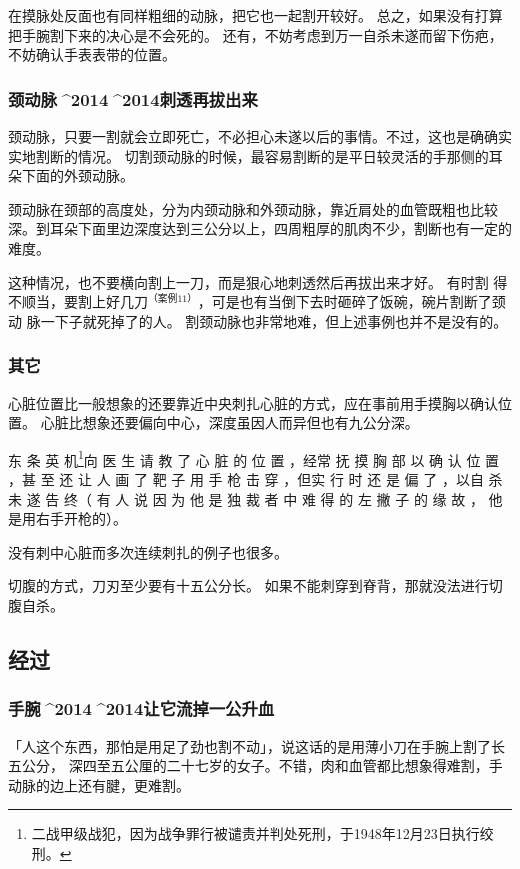\documentclass[UTF8]{ctexart}
\begin{document}
在摸脉处反面也有同样粗细的动脉，把它也一起割开较好。
总之，如果没有打算把手腕割下来的决心是不会死的。 
还有，不妨考虑到万一自杀未遂而留下伤疤，不妨确认手表表带的位置。

\subsubsection{颈动脉^^^^2014^^^^2014刺透再拔出来}

颈动脉，只要一割就会立即死亡，不必担心未遂以后的事情。不过，这也是确确实实地割断的情况。
切割颈动脉的时候，最容易割断的是平日较灵活的手那侧的耳朵下面的外颈动脉。

颈动脉在颈部的高度处，分为内颈动脉和外颈动脉，靠近肩处的血管既粗也比较深。到耳朵下面里边深度达到三公分以上，四周粗厚的肌肉不少，割断也有一定的难度。

这种情况，也不要横向割上一刀，而是狠心地刺透然后再拔出来才好。
有时割 得不顺当，要割上好几刀$^{（案例11）}$，可是也有当倒下去时砸碎了饭碗，碗片割断了颈动 脉一下子就死掉了的人。
割颈动脉也非常地难，但上述事例也并不是没有的。

\subsubsection{其它}

心脏位置比一般想象的还要靠近中央刺扎心脏的方式，应在事前用手摸胸以确认位置。
心脏比想象还要偏向中心，深度虽因人而异但也有九公分深。

东 条 英 机\footnote{二战甲级战犯，因为战争罪行被谴责并判处死刑，于1948年12月23日执行绞刑。}向 医 生 请 教 了 心 脏 的 位 置 ，经常 抚 摸 胸 部 以 确 认 位 置 ，甚 至 还 让 人 画 了 靶 子 用 手 枪 击 穿 ，但实 行 时 还 是 偏 了 ，以自 杀 未 遂 告 终（ 有 人 说 因 为 他 是 独 裁 者 中 难 得 的 左 撇 子 的 缘 故 ， 他是用右手开枪的）。

没有刺中心脏而多次连续刺扎的例子也很多。

切腹的方式，刀刃至少要有十五公分长。
如果不能刺穿到脊背，那就没法进行切腹自杀。

\subsection{经过}

\subsubsection{手腕^^^^2014^^^^2014让它流掉一公升血}

「人这个东西，那怕是用足了劲也割不动」，说这话的是用薄小刀在手腕上割了长五公分，
深四至五公厘的二十七岁的女子。不错，肉和血管都比想象得难割，手动脉的边上还有腱，更难割。
\end{document}
